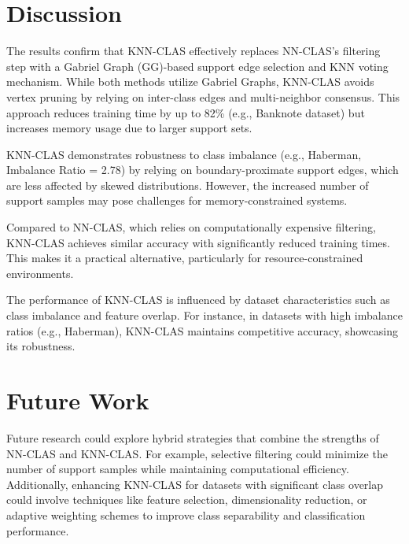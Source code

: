 \documentclass[conference]{IEEEtran}
\begin{document}
\section{Discussion}

The results confirm that KNN-CLAS effectively replaces NN-CLAS's filtering step with a Gabriel Graph (GG)-based support edge selection and KNN voting mechanism. While both methods utilize Gabriel Graphs, KNN-CLAS avoids vertex pruning by relying on inter-class edges and multi-neighbor consensus. This approach reduces training time by up to 82\% (e.g., Banknote dataset) but increases memory usage due to larger support sets.

KNN-CLAS demonstrates robustness to class imbalance (e.g., Haberman, Imbalance Ratio = 2.78) by relying on boundary-proximate support edges, which are less affected by skewed distributions. However, the increased number of support samples may pose challenges for memory-constrained systems.

Compared to NN-CLAS, which relies on computationally expensive filtering, KNN-CLAS achieves similar accuracy with significantly reduced training times. This makes it a practical alternative, particularly for resource-constrained environments.

The performance of KNN-CLAS is influenced by dataset characteristics such as class imbalance and feature overlap. For instance, in datasets with high imbalance ratios (e.g., Haberman), KNN-CLAS maintains competitive accuracy, showcasing its robustness.

\section{Future Work}
Future research could explore hybrid strategies that combine the strengths of NN-CLAS and KNN-CLAS. For example, selective filtering could minimize the number of support samples while maintaining computational efficiency. Additionally, enhancing KNN-CLAS for datasets with significant class overlap could involve techniques like feature selection, dimensionality reduction, or adaptive weighting schemes to improve class separability and classification performance.
\end{document}
